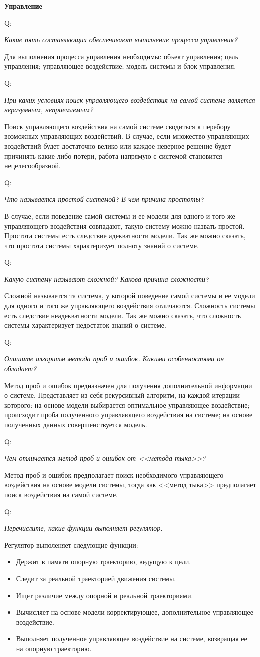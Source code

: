 \documentclass{article}
\renewcommand{\subsection}[1]{
	\vspace{2em}
	\begin{flushright}
		\large
		\textbf{#1}
	\end{flushright}
	}
\newcommand{\question}[2]{
	\begin{flushright}
		Q:\hspace{2ex}\vline\hspace{2ex}
		\begin{minipage}{0.9\textwidth}
			\large
			\textit{#1}
		\end{minipage}
	\end{flushright}
	\begin{center}
		\begin{minipage}{0.95\textwidth}
			#2
		\end{minipage}
	\end{center}
	}
\begin{document}
\subsection{Управление}
\question{Какие пять составляющих обеспечивают выполнение процесса управления?}{Для выполнения процесса управления необходимы: объект управления; цель управления; управляющее воздействие; модель системы и блок управления.}
\question{При каких условиях поиск управляющего воздействия на самой системе является неразумным, неприемлемым?}{Поиск управляющего воздействия на самой системе сводиться к перебору возможных управляющих воздействий. В случае, если множество управляющих воздействий будет достаточно велико или каждое неверное решение будет причинять какие-либо потери, работа напрямую с системой становится нецелесообразной.}
\question{Что называется простой системой? В чем причина простоты?}{В случае, если поведение самой системы и ее модели для одного и того же управляющего воздействия совпадают, такую систему можно назвать простой. Простота системы есть следствие адекватности модели. Так же можно сказать, что простота системы характеризует полноту знаний о системе.}
\question{Какую систему называют сложной? Какова причина сложности?}{Сложной называется та система, у которой поведение самой системы и ее модели для одного и того же управляющего воздействия отличаются. Сложность системы есть следствие неадекватности модели. Так же можно сказать, что сложность системы характеризует недостаток знаний о системе. }
\question{Опишите алгоритм метода проб и ошибок. Какими особенностями он обладает?}{Метод проб и ошибок предназначен для получения дополнительной информации о системе. Представляет из себя рекурсивный алгоритм, на каждой итерации которого: на основе модели выбирается оптимальное управляющее воздействие; происходит проба полученного управляющего воздействия на системе; на основе полученных данных совершенствуется модель.}
\question{Чем отличается метод проб и ошибок от <<метода тыка>>?}{Метод проб и ошибок предполагает поиск необходимого управляющего воздействия на основе модели системы, тогда как <<метод тыка>> предполагает поиск воздействия на самой системе.}
\question{Перечислите, какие функции выполняет регулятор.}{Регулятор выполеняет следующие функции:
\begin{itemize}
	\item Держит в памяти опорную траекторию, ведущую к цели.
	\item Следит за реальной траекторией движения системы.
	\item Ищет различие между опорной и реальной траекториями.
	\item Вычисляет на основе модели корректирующее, дополнительное управляющее воздействие.
	\item Выполняет полученное управляющее воздействие на системе, возвращая ее на опорную траекторию.
\end{itemize}}
\end{document}
